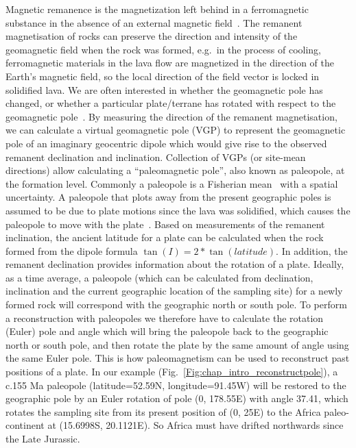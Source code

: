 Magnetic remanence is the magnetization left behind in a ferromagnetic substance
in the absence of an external magnetic field~\citep{T19}. The remanent
magnetisation of rocks can preserve the direction and intensity of the
geomagnetic field when the rock was formed, e.g.\ in the process of cooling,
ferromagnetic materials in the lava flow are magnetized in the direction of the
Earth's magnetic field, so the local direction of the field vector is locked in
solidified lava. We are often interested in whether the geomagnetic pole has
changed, or whether a particular plate/terrane has rotated with respect to the
geomagnetic pole~\citep{T19}. By measuring the direction of the remanent
magnetisation, we can calculate a virtual geomagnetic pole (VGP) to represent
the geomagnetic pole of an imaginary geocentric dipole which would give rise to
the observed remanent declination and inclination. Collection of VGPs (or
site-mean directions) allow calculating a ``paleomagnetic pole'', also known as
paleopole, at the formation level. Commonly a paleopole is a Fisherian
mean~\citep{F53} with a spatial uncertainty. A paleopole that plots away from the
present geographic poles is assumed to be due to plate motions since the lava
was solidified, which causes the paleopole to move with the plate~\citep{T08}.
Based on measurements of the remanent inclination, the ancient latitude for a
plate can be calculated when the rock formed from the dipole formula $\tan(I) =
2 *\tan(latitude)$. In addition, the remanent declination provides information
about the rotation of a plate. Ideally, as a time average, a paleopole (which
can be calculated from declination, inclination and the current geographic
location of the sampling site) for a newly formed rock will correspond with the
geographic north or south pole. To perform a reconstruction with paleopoles we
therefore have to calculate the rotation (Euler) pole and angle which will bring
the paleopole back to the geographic north or south pole, and then rotate the
plate by the same amount of angle using the same Euler pole. This is how
paleomagnetism can be used to reconstruct past positions of a plate. In our
example (Fig.~\ref{Fig:chap_intro_reconstructpole}), a c.155 Ma paleopole
(latitude=52.59\degree{}N, longitude=91.45\degree{}W) will be restored to the
geographic pole by an Euler rotation of pole (0\degree, 178.55\degree{}E) with
angle 37.41\degree, which rotates the sampling site from its present position of
(0\degree, 25\degree{}E) to the Africa paleo-continent at (15.6998\degree{}S,
20.1121\degree{}E). So Africa must have drifted northwards since the Late
Jurassic.

